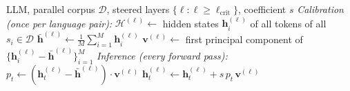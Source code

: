 \begin{algorithm}[t]
  \caption{Latent-space language steering}
  \label{alg:steering}
  \begin{algorithmic}[1]
    \Require LLM, parallel corpus $\mathcal{D}$, steered layers $\{\ell : \ell \geq \ell_{\text{crit}}\}$, coefficient $s$
    \Statex \textit{Calibration (once per language pair):}
    \State $\mathcal{H}^{(\ell)} \gets$ hidden states $\mathbf{h}_i^{(\ell)}$ of all tokens of all $s_i \in \mathcal{D}$ 
    \State $\bar{\mathbf{h}}^{(\ell)} \gets \frac{1}{M} \sum_{i=1}^{M} \mathbf{h}_i^{(\ell)}$
    \State $\mathbf{v}^{(\ell)} \gets$ first principal component of $\{\mathbf{h}_i^{(\ell)} - \bar{\mathbf{h}}^{(\ell)}\}_{i=1}^{M}$
    \EndFor
    \Statex \textit{Inference (every forward pass):}
    \State $p_t \gets (\mathbf{h}_t^{(\ell)} - \bar{\mathbf{h}}^{(\ell)}) \cdot \mathbf{v}^{(\ell)}$ 
    \State $\mathbf{h}_t^{(\ell)} \gets \mathbf{h}_t^{(\ell)} + s \, p_t \, \mathbf{v}^{(\ell)}$
    \EndFor
  \end{algorithmic}
\end{algorithm}
